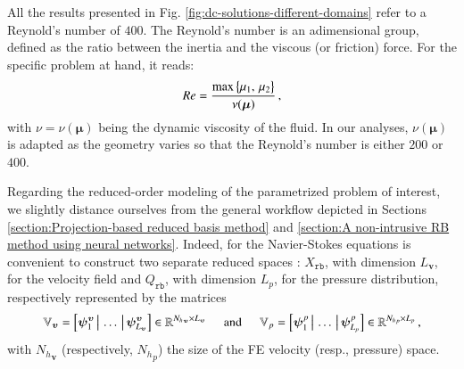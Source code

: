 \documentclass{elsarticle}
\numberwithin{equation}{section}
\theoremstyle{theorem}
\theoremstyle{definition}
\theoremstyle{remark}
\theoremstyle{proposition}
\numberwithin{figure}{section}
\newcommand{\bg}[1]{\boldsymbol{#1}}
\begin{document}
		All the results presented in Fig. \ref{fig:dc-solutions-different-domains} refer to a Reynold's number of $400$. The Reynold's number is an adimensional group, defined as the ratio between the inertia and the viscous (or friction) force. For the specific problem at hand, it reads:
		\begin{equation*}
			\vspace*{-0.1cm}
			Re = \dfrac{\max \big\lbrace \mu_1, \, \mu_2 \big\rbrace}{\nu(\bg{\mu})} \, ,
		\end{equation*}
		with $\nu = \nu(\bg{\mu})$ being the dynamic viscosity of the fluid. In our analyses, $\nu(\bg{\mu})$ is adapted as the geometry varies so that the Reynold's number is either $200$ or $400$. %
																			
		Regarding the reduced-order modeling of the parametrized problem of interest, we slightly distance ourselves from the general workflow depicted in Sections \ref{section:Projection-based reduced basis method} and \ref{section:A non-intrusive RB method using neural networks}. Indeed, for the Navier-Stokes equations is convenient to construct two separate reduced spaces \cite{Bal14, Chen17, QMN15}: $X_{\texttt{rb}}$, with dimension $L_{\bg{v}}$, for the velocity field and $Q_{\texttt{rb}}$, with dimension $L_p$, for the pressure distribution, respectively represented by the matrices 
		\begin{equation*}
			\mathbb{V}_{\bg{v}} = \left[ \bg{\psi}_1^{\bg{v}} \, \big| \, \ldots \, \big| \, \bg{\psi}_{L_{\bg{v}}}^{\bg{v}} \right] \in \mathbb{R}^{{N_h}_{\bg{v}} \times L_{\bg{v}}} \hspace*{0.5cm} \text{and} \hspace*{0.5cm} \mathbb{V}_p = \left[ \bg{\psi}_1^p \, \big| \, \ldots \, \big| \, \bg{\psi}_{L_p}^p \right] \in \mathbb{R}^{{N_h}_p \times L_p} \, ,
		\end{equation*} 
		with ${N_h}_{\bg{v}}$ (respectively, ${N_h}_p$) the size of the FE velocity (resp., pressure) space. 
		
\end{document}
